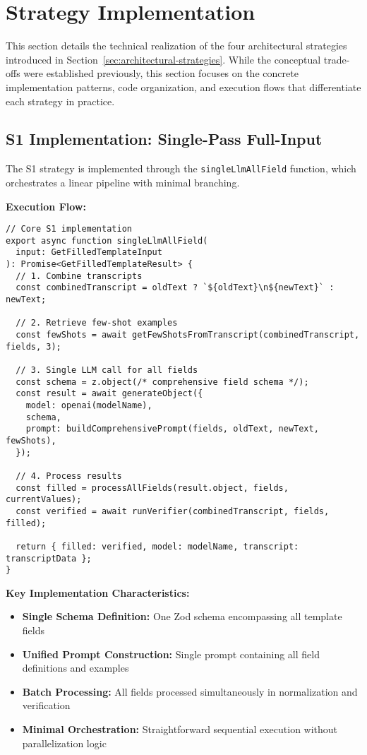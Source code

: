 \section{Strategy Implementation}
\label{sec:impl-strategies}

This section details the technical realization of the four architectural strategies introduced in Section~\ref{sec:architectural-strategies}. While the conceptual trade-offs were established previously, this section focuses on the concrete implementation patterns, code organization, and execution flows that differentiate each strategy in practice.

\subsection{S1 Implementation: Single-Pass Full-Input}
\label{subsec:impl-s1}

The S1 strategy is implemented through the \texttt{singleLlmAllField} function, which orchestrates a linear pipeline with minimal branching.

\textbf{Execution Flow:}
\begin{verbatim}
// Core S1 implementation
export async function singleLlmAllField(
  input: GetFilledTemplateInput
): Promise<GetFilledTemplateResult> {
  // 1. Combine transcripts
  const combinedTranscript = oldText ? `${oldText}\n${newText}` : newText;
  
  // 2. Retrieve few-shot examples
  const fewShots = await getFewShotsFromTranscript(combinedTranscript, fields, 3);
  
  // 3. Single LLM call for all fields
  const schema = z.object(/* comprehensive field schema */);
  const result = await generateObject({
    model: openai(modelName),
    schema,
    prompt: buildComprehensivePrompt(fields, oldText, newText, fewShots),
  });
  
  // 4. Process results
  const filled = processAllFields(result.object, fields, currentValues);
  const verified = await runVerifier(combinedTranscript, fields, filled);
  
  return { filled: verified, model: modelName, transcript: transcriptData };
}
\end{verbatim}

\textbf{Key Implementation Characteristics:}
\begin{itemize}
    \item \textbf{Single Schema Definition:} One Zod schema encompassing all template fields
    \item \textbf{Unified Prompt Construction:} Single prompt containing all field definitions and examples
    \item \textbf{Batch Processing:} All fields processed simultaneously in normalization and verification
    \item \textbf{Minimal Orchestration:} Straightforward sequential execution without parallelization logic
\end{itemize}

